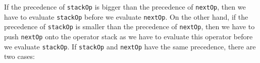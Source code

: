 \begin{table}[!h]
  \centering
{}
  \caption{Precedences of the operators.}
  \label{tab:predence}
\end{table}

If the precedence of \texttt{stackOp} is bigger than the precedence of \texttt{nextOp}, then we have
to evaluate \texttt{stackOp} before we evaluate \texttt{nextOp}.  On the other hand, if the precedence
of \texttt{stackOp} is smaller than the precedence of \texttt{nextOp}, then we have to push
\texttt{nextOp} onto the operator stack as we have to evaluate this operator before we evaluate \texttt{stackOp}.
If \texttt{stackOp} and \texttt{nextOp} have the same precedence, there are two cases:
